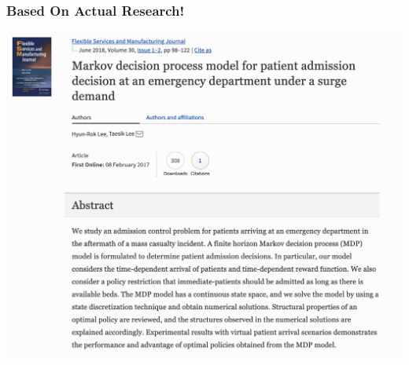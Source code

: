 \documentclass{beamer}
\begin{document}
\begin{frame}
  \frametitle{Based On Actual Research!}
  \centering
  \includegraphics[scale = .3]{paper}
\end{frame}



%
%
%
%
%
\end{document}

